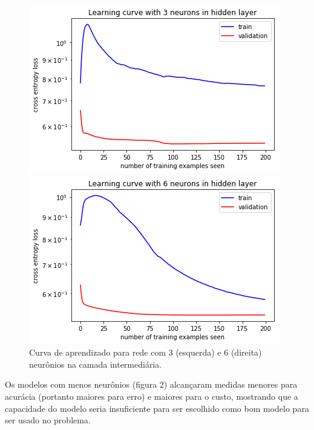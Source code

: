 \documentclass[a4paper, 12pt]{article}
\begin{document}
\begin{figure}[H]
\centering
\begin{minipage}{.5\textwidth}
  \centering
  \includegraphics[width=.9\linewidth]{images/online_curve_h_3.png}
\end{minipage}%
\begin{minipage}{.5\linewidth}
  \centering
  \includegraphics[width=.9\linewidth]{images/online_curve_h_6.png}
\end{minipage}
    \caption{Curva de aprendizado para rede com 3 (esquerda) e 6 (direita) neurônios na camada intermediária.}
\end{figure}

Os modelos com menos neurônios (figura 2) alcançaram medidas menores para acurácia (portanto maiores para erro) e maiores para o custo, mostrando que a capacidade do modelo seria insuficiente para ser escolhido como bom modelo para ser usado no problema.
\end{document}
